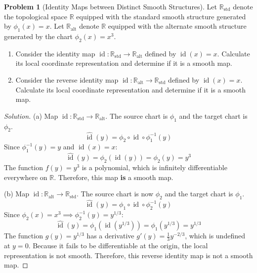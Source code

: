 \documentclass[12pt, a4paper]{article}
\theoremstyle{definition}
\newtheorem{problem}{Problem}
\newenvironment{solution}
  {\renewcommand\qedsymbol{$\blacksquare$}\begin{proof}[Solution]}
  {\end{proof}}
\DeclareMathOperator{\id}{id}
\newcommand{\RR}{\mathbb{R}}
\begin{document}
\begin{problem}[Identity Maps between Distinct Smooth Structures]
Let $\RR_{\text{std}}$ denote the topological space $\RR$ equipped with the standard smooth structure generated by $\phi_1(x) = x$. Let $\RR_{\text{alt}}$ denote $\RR$ equipped with the alternate smooth structure generated by the chart $\phi_2(x) = x^3$.
\begin{enumerate}
    \item[(a)] Consider the identity map $\id: \RR_{\text{std}} \to \RR_{\text{alt}}$ defined by $\id(x) = x$. Calculate its local coordinate representation and determine if it is a smooth map.
    \item[(b)] Consider the reverse identity map $\id: \RR_{\text{alt}} \to \RR_{\text{std}}$ defined by $\id(x) = x$. Calculate its local coordinate representation and determine if it is a smooth map.
\end{enumerate}
\end{problem}
\begin{solution}
(a) Map $\id: \RR_{\text{std}} \to \RR_{\text{alt}}$.
The source chart is $\phi_1$ and the target chart is $\phi_2$. 
\[
\widehat{\id}(y) = \phi_2 \circ \id \circ \phi_1^{-1}(y)
\]
Since $\phi_1^{-1}(y) = y$ and $\id(x) = x$:
\[
\widehat{\id}(y) = \phi_2( \id(y) ) = \phi_2(y) = y^3
\]
The function $f(y) = y^3$ is a polynomial, which is infinitely differentiable everywhere on $\RR$. Therefore, this map \textbf{is} a smooth map.

(b) Map $\id: \RR_{\text{alt}} \to \RR_{\text{std}}$.
The source chart is now $\phi_2$ and the target chart is $\phi_1$.
\[
\widehat{\id}(y) = \phi_1 \circ \id \circ \phi_2^{-1}(y)
\]
Since $\phi_2(x) = x^3 \implies \phi_2^{-1}(y) = y^{1/3}$:
\[
\widehat{\id}(y) = \phi_1( \id(y^{1/3}) ) = \phi_1(y^{1/3}) = y^{1/3}
\]
The function $g(y) = y^{1/3}$ has a derivative $g'(y) = \frac{1}{3}y^{-2/3}$, which is undefined at $y = 0$. Because it fails to be differentiable at the origin, the local representation is not smooth. Therefore, this reverse identity map is not a smooth map.
\end{solution}

\vfill\newpage
\end{document}
